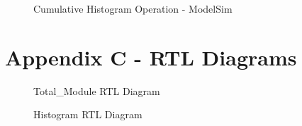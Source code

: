 \documentclass[12pt]{article}
\begin{document}
  \begin{figure}[H]
    \caption{Cumulative Histogram Operation - ModelSim}
    \label{fig:nomr_modhist}
  \end{figure}
  
  \section{Appendix C - RTL Diagrams}
    \begin{figure}[H]
    \caption{Total\_Module RTL Diagram}
    \label{fig:nomr_modhissast}
  \end{figure}
  
  
    \begin{figure}[H]
    \caption{Histogram RTL Diagram}
    \label{fig:nomr_modhisrtt}
  \end{figure}
  
\end{document}
